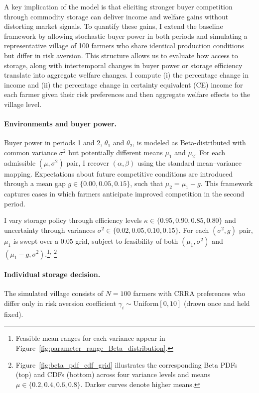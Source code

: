 A key implication of the model is that eliciting stronger buyer competition through commodity storage can deliver income and welfare gains without distorting market signals. To quantify these gains, I extend the baseline framework by allowing stochastic buyer power in both periods and simulating a representative village of 100 farmers who share identical production conditions but differ in risk aversion. This structure allows us to evaluate how access to storage, along with intertemporal changes in buyer power or storage efficiency translate into aggregate welfare changes. I compute (i) the percentage change in income and (ii) the percentage change in certainty equivalent (CE) income for each farmer given their risk preferences and then aggregate welfare effects to the village level.

\paragraph{Environments and buyer power.}
Buyer power in periods 1 and 2, $\theta_1$ and $\theta_2$, is modeled as Beta-distributed with common variance $\sigma^2$ but potentially different means $\mu_1$ and $\mu_2$. For each admissible $(\mu,\sigma^2)$ pair, I recover $(\alpha,\beta)$ using the standard mean–variance mapping. Expectations about future competitive conditions are introduced through a mean gap $g\in\{0.00,0.05,0.15\}$, such that $\mu_2=\mu_1-g$. This framework captures cases in which farmers anticipate improved competition in the second period.

I vary storage policy through efficiency levels $\kappa\in\{0.95,0.90,0.85,0.80\}$ and uncertainty through variances $\sigma^2\in\{0.02,0.05,0.10,0.15\}$. For each $(\sigma^2,g)$ pair, $\mu_1$ is swept over a $0.05$ grid, subject to feasibility of both $(\mu_1,\sigma^2)$ and $(\mu_1-g,\sigma^2)$.\footnote{Feasible mean ranges for each variance appear in Figure~\ref{fig:parameter_range_Beta_distribution}.}$^,$ \footnote{Figure~\ref{fig:beta_pdf_cdf_grid} illustrates the corresponding Beta PDFs (top) and CDFs (bottom) across four variance levels and means $\mu\in\{0.2,0.4,0.6,0.8\}$. Darker curves denote higher means.}




\paragraph{Individual storage decision.}
The simulated village consists of $N=100$ farmers with CRRA preferences who differ only in risk aversion coefficient $\gamma_i\sim \mathrm{Uniform}[0,10]$ (drawn once and held fixed).

